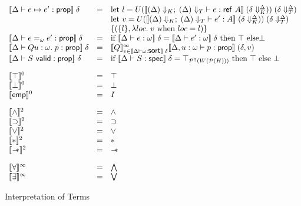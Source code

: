 \begin{figure}
\begin{displaymath}
\begin{array}{lcl}
\interp{\judgeA{e \pointsto e'}{\assert}}\;\delta & = & 
    \mbox{let } l = U(\interp{\judgeE[\restrictkind{\Delta}]{\restricttype{\Delta}}{e}{\reftype{A}}}\;(\restricttyenv{\Delta}{\delta}))\;(\restrictvals{\Delta}{\delta}) \\
& &  \mbox{let }v = U(\interp{\judgeE[\restrictkind{\Delta}]{\restricttype{\Delta}}{e'}{A}}\;(\restricttyenv{\Delta}{\delta}))\;(\restrictvals{\Delta}{\delta}) \\
& & \setof{(\setof{l}, \semfun{loc}{v \mbox{ when } loc = l})} \\


\interp{\judgeA{e =_\omega e'}{\assert}}\;\delta & = & 
   \mbox{if }\interp{\judgeA{e}{\omega}}\;\delta = \interp{\judgeA{e'}{\omega}}\;\delta 
   \mbox{ then } \top \mbox{ else} \bot \\

\interp{\judgeA{Q u:\omega.\; p}{\assert}}\;\delta & = & 
  \interp{Q}^\infty_{v \in \interp{\judgeSort{\omega}}\;\delta}
    \interp{\judgeA[\Delta, u:\omega]{p}{\assert}}\;(\delta, v) \\

\interp{\judgeA{\validprop{S}}{\assert}}\;\delta & = & 
   \mbox{if } \interp{\judgeS{S}}\;\delta = \top_{\upset{W(\powerset{H})}}
   \mbox{ then } \top
   \mbox{ else } \bot \\[1em]


\interp{\top}^0 & = & \top \\
\interp{\bot}^0 & = & \bot \\
\interp{\emp}^0 & = & I \\[1em]

\interp{\land}^2    & = & \land \\
\interp{\implies}^2 & = & \implies \\
\interp{\vee}^2     & = & \vee \\
\interp{*}^2        & = & * \\
\interp{\wand}^2    & = & \wand \\[1em]

\interp{\forall}^\infty & = & \bigwedge \\
\interp{\exists}^\infty & = & \bigvee \\
\end{array}
\end{displaymath}
\caption{ Interpretation of Terms }
\label{term-interpretation}  
\end{figure}

